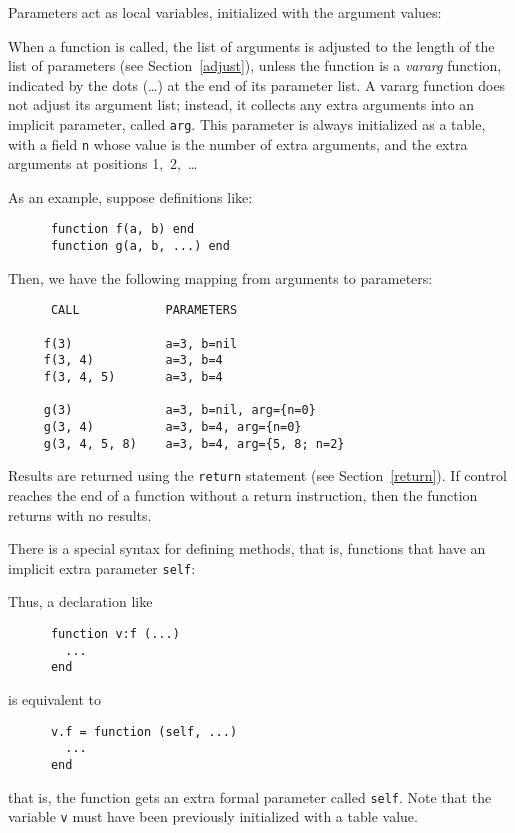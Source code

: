 \documentclass[11pt]{article}
\newcommand{\See}[1]{Section~\ref{#1}}
\newcommand{\see}[1]{(see \See{#1})}
\newcommand{\T}[1]{{\tt #1}}
\newcommand{\Index}[1]{#1\index{#1}}
\newcommand{\IndexVerb}[1]{\T{#1}\index{#1}}
\newcommand{\Def}[1]{\emph{#1}\index{#1}}
\begin{document}
Parameters act as local variables,
initialized with the argument values:
\begin{Produc}
\end{Produc}
\label{vararg}
When a function is called,
the list of \Index{arguments} is adjusted to
the length of the list of parameters \see{adjust},
unless the function is a \Def{vararg} function,
indicated by the dots (\ldots) at the end of its parameter list.
A vararg function does not adjust its argument list;
instead, it collects any extra arguments into an implicit parameter,
called \IndexVerb{arg}.
This parameter is always initialized as a table,
with a field \verb|n| whose value is the number of extra arguments,
and the extra arguments at positions 1,~2,~\ldots

As an example, suppose definitions like:
\begin{verbatim}
      function f(a, b) end
      function g(a, b, ...) end
\end{verbatim}
Then, we have the following mapping from arguments to parameters:
\begin{verbatim}
      CALL            PARAMETERS

     f(3)             a=3, b=nil
     f(3, 4)          a=3, b=4
     f(3, 4, 5)       a=3, b=4

     g(3)             a=3, b=nil, arg={n=0}
     g(3, 4)          a=3, b=4, arg={n=0}
     g(3, 4, 5, 8)    a=3, b=4, arg={5, 8; n=2}
\end{verbatim}

Results are returned using the \verb|return| statement \see{return}.
If control reaches the end of a function without a return instruction,
then the function returns with no results.

There is a special syntax for defining \Index{methods},
that is, functions that have an implicit extra parameter \IndexVerb{self}:
\begin{Produc}
\end{Produc}%
Thus, a declaration like
\begin{verbatim}
      function v:f (...)
        ...
      end
\end{verbatim}
is equivalent to
\begin{verbatim}
      v.f = function (self, ...)
        ...
      end
\end{verbatim}
that is, the function gets an extra formal parameter called \verb|self|.
Note that the variable \verb|v| must have been
previously initialized with a table value.
\end{document}
